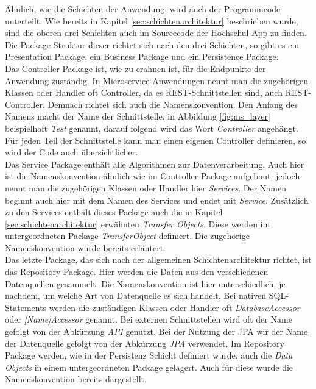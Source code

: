 Ähnlich, wie die Schichten der Anwendung, wird auch der Programmcode unterteilt. Wie bereits in Kapitel \ref{sec:schichtenarchitektur} beschrieben wurde, sind die oberen drei Schichten auch im Sourcecode der Hochschul-\ac{App} zu finden. Die Package Struktur dieser richtet sich nach den drei Schichten, so gibt es ein Presentation Package, ein Business Package und ein Persistence Package. 
\\
\linebreak
Das Controller Package ist, wie zu erahnen ist, für die Endpunkte der Anwendung zuständig. In Microservice Anwendungen nennt man die zugehörigen Klassen oder Handler oft Controller, da es \ac{REST}-Schnittstellen sind, auch \ac{REST}-Controller. Demnach richtet sich auch die Namenskonvention. Den Anfang des Namens macht der Name der Schnittstelle, in Abbildung \ref{fig:ms_layer} beispielhaft \textit{Test} genannt, darauf folgend wird das Wort \textit{Controller} angehängt. Für jeden Teil der Schnittstelle kann man einen eigenen Controller definieren, so wird der Code auch übersichtlicher. 
\\
\linebreak
Das Service Package enthält alle Algorithmen zur Datenverarbeitung. Auch hier ist die Namenskonvention ähnlich wie im Controller Package aufgebaut, jedoch nennt man die zugehörigen Klassen oder Handler hier \textit{Services}. Der Namen beginnt auch hier mit dem Namen des Services und endet mit \textit{Service}. Zusätzlich zu den Services enthält dieses Package auch die in Kapitel \ref{sec:schichtenarchitektur} erwähnten \textit{Transfer Objects}. Diese werden im untergeordneten Package \textit{TransferObject} definiert. Die zugehörige Namenskonvention wurde bereits erläutert.
\\
\linebreak
Das letzte Package, das sich nach der allgemeinen Schichtenarchitektur richtet, ist das Repository Package. Hier werden die Daten aus den verschiedenen Datenquellen gesammelt. Die Namenskonvention ist hier unterschiedlich, je nachdem, um welche Art von Datenquelle es sich handelt. Bei nativen \ac{SQL}-Statements werden die zuständigen Klassen oder Handler oft \textit{DatabaseAccessor} oder \textit{[Name]Accessor} genannt. Bei externen Schnittstellen wird oft der Name gefolgt von der Abkürzung \textit{\ac{API}} genutzt. Bei der Nutzung der \ac{JPA} wir der Name der Datenquelle gefolgt von der Abkürzung \textit{\ac{JPA}} verwendet. Im Repository Package werden, wie in der Persistenz Schicht definiert wurde, auch die \textit{Data Objects} in einem untergeordneten Package gelagert. Auch für diese wurde die Namenskonvention bereits dargestellt. 
